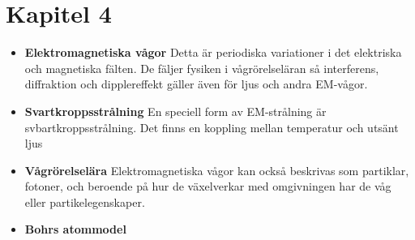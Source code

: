 \documentclass[11pt]{article}
\begin{document}
\section{Kapitel 4}
\begin{itemize}
    \item{\textbf{Elektromagnetiska vågor} Detta är periodiska variationer i det elektriska och magnetiska fälten. De fäljer fysiken i vågrörelseläran så interferens, diffraktion och dipplereffekt gäller även för ljus och andra EM-vågor.}

    \item{\textbf{Svartkroppsstrålning} En speciell form av EM-strålning är svbartkroppsstrålning. Det finns en koppling mellan temperatur och utsänt ljus}

    \item{\textbf{Vågrörelselära} Elektromagnetiska vågor kan också beskrivas som partiklar, fotoner, och beroende på hur de växelverkar med omgivningen har de våg eller partikelegenskaper.}

    \item{\textbf{Bohrs atommodel} }
\end{itemize}
\end{document}
